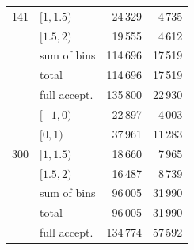 \documentclass[reprint,amsmath,amssymb,aps,prd,floatfix]{revtex4-2}
\begin{document}
\begin{table}[htbp]
\begin{ruledtabular}
\begin{tabular}{llrr}
141 & $[1, 1.5)$   & 24\,329 & 4\,735 \\
    & $[1.5, 2)$   & 19\,555 & 4\,612 \\
    & sum of bins  & 114\,696 & 17\,519 \\
    & total        & 114\,696 & 17\,519 \\
    & full accept. & 135\,800 & 22\,930 \\
\colrule
    & $[-1, 0)$    & 22\,897 & 4\,003 \\
    & $[0, 1)$     & 37\,961 & 11\,283 \\
300 & $[1, 1.5)$   & 18\,660 & 7\,965 \\
    & $[1.5, 2)$   & 16\,487 & 8\,739 \\
    & sum of bins  & 96\,005 & 31\,990 \\
    & total        & 96\,005 & 31\,990 \\
    & full accept. & 134\,774 & 57\,592 \\
\end{tabular}
\end{ruledtabular}
\end{table}


\end{document}
